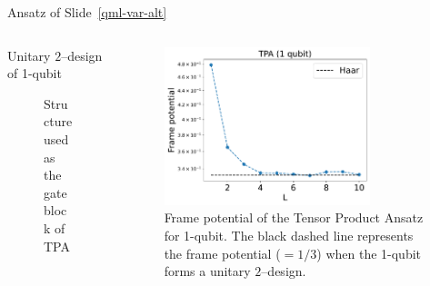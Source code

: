 \documentclass[dvipdfmx,10pt,aspectratio=169]{beamer}
\begin{document}
\begin{frame}{Ansatz of Slide~\ref{qml-var-alt}}
    \begin{columns}
        \begin{column}{0.5\textwidth}
        Unitary $2$--design of 1-qubit
        \begin{figure}[H]
            \centering
            \caption{Structure used as the gate block of TPA}
            \label{fig:tpa-example}
        \end{figure}
        \end{column}
        
        \begin{column}{0.5\textwidth}
            \begin{figure}[H]
                \centering
                \includegraphics[width=6cm]{1qubit-tpa-exp.pdf}
                \caption{Frame potential of the Tensor Product Ansatz for 1-qubit. The black dashed line represents the frame potential ($=1/3$) when the 1-qubit forms a unitary $2$--design.}
                \label{fig:1qubit-tpa-exp}
            \end{figure}
        \end{column}
    \end{columns}
\end{frame}
\end{document}
